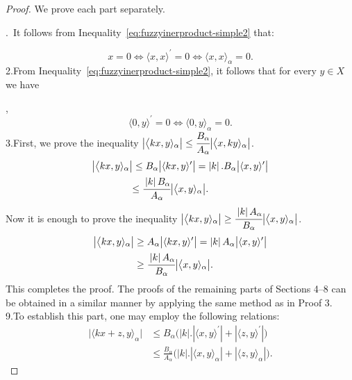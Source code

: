 \documentclass[preprint,12pt]{elsarticle}
\newcommand{\abs}[1]{\left\vert#1\right\vert}
\theoremstyle{definition}
\begin{document}
\begin{proof}
	We prove each part separately.
	
	.\ It follows from Inequality~\eqref{eq:fuzzyinerproduct-simple2} that:
	
	\[
	x=0\Leftrightarrow \langle x, x\rangle^\prime=0\Leftrightarrow\langle x, x\rangle_\alpha=0.
	\]
	\noindent 2.From Inequality~\eqref{eq:fuzzyinerproduct-simple2}, it follows that for every $y \in X$ we have
	
	,\[\langle 0, y\rangle^\prime=0\Leftrightarrow \langle 0, y\rangle_\alpha=0.\]
	\noindent 3.First, we prove the inequality \( \big|\big\langle kx, y\rangle_\alpha\big| \leq \cfrac{B_\alpha}{A_\alpha}	\big|\big\langle x, ky\rangle_\alpha\big| \).
	\begin{align*}
		\big|\big\langle kx, y\rangle_\alpha&\big|\leq B_\alpha\big|\langle kx, y\rangle^\prime\big|=\abs{k}.B_\alpha\big|\langle x, y\rangle^\prime\big|\\ &\leq
		\cfrac{\abs{k}B_\alpha}{A_\alpha}	\big|\big\langle x, y\rangle_\alpha\big|.
	\end{align*}
	Now it is enough to prove the inequality \( \big|\big\langle kx, y\rangle_\alpha\big| \geq \cfrac{\abs{k}A_\alpha}{B_\alpha}	\big|\big\langle x, y\rangle_\alpha\big| \).
	\begin{align*}
		\big|\big\langle kx, y\rangle_\alpha\big|&\geq A_\alpha\big|\langle kx, y\rangle^\prime\big|=\abs{k}A_\alpha\big|\langle x, y\rangle^\prime\big|\\ &\geq
		\cfrac{\abs{k}A_\alpha}{B_\alpha}	\big|\big\langle x, y\rangle_\alpha\big|.
	\end{align*}
	This completes the proof. The proofs of the remaining parts of Sections 4–8 can be obtained in a similar manner by applying the same method as in Proof 3.\\
	\noindent
	9.To establish this part, one may employ the following relations: 
	\[
	\begin{aligned}
		\big|\langle kx+z, y\rangle_\alpha\big|
		&\leq B_\alpha \big(\abs{k}. |\langle x, y\rangle^\prime| + |\langle z, y\rangle^\prime| \big) \\
		&\leq \frac{B_\alpha}{A_\alpha} 
		\big( \abs{k}.|\langle x, y\rangle_\alpha| + |\langle z, y\rangle_\alpha| \big).
	\end{aligned}
	\]
	
	
\end{proof}
\end{document}
